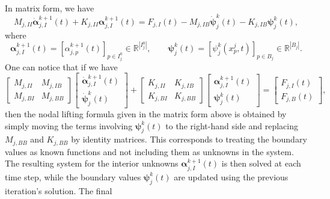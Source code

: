 \documentclass[a4paper, 11pt]{article}
\theoremstyle{remark}
\begin{document}
\begin{enumerate}[label = (\arabic*)]
\begin{align*}
\end{align*}
In matrix form, we have
\begin{equation*}
    M_{j, II}\boldsymbol{\dot{\alpha}}_{j, I}^{k+1}(t) + K_{j, II}\boldsymbol{\alpha}_{j, I}^{k+1}(t) = F_{j, I}(t) - M_{j, IB}\boldsymbol{\dot{\psi}}_{j}^{k}(t) - K_{j, IB}\boldsymbol{\psi}_{j}^{k}(t),
\end{equation*}
where
\begin{equation*}
    \boldsymbol{\alpha}_{j, I}^{k+1}(t) = [\alpha_{j, p}^{k+1}(t)]_{p\in I^{0}_{j}}\in\mathbb{R}^{|I^{0}_{j}|}, \qquad \boldsymbol{\psi}_{j}^{k}(t) = [\psi_{j}^{k}(x^{j}_{p}, t)]_{p\in B_{j}}\in\mathbb{R}^{|B_{j}|}.
\end{equation*}
One can notice that if we have
\begin{equation*}
    \begin{bmatrix}
        M_{j, II} & M_{j, IB}\\
        M_{j, BI} & M_{j, BB}
    \end{bmatrix}
    \begin{bmatrix}
        \boldsymbol{\dot{\alpha}}_{j, I}^{k+1}(t)\\
        \boldsymbol{\dot{\psi}}_{j}^{k}(t)
    \end{bmatrix}
    + 
    \begin{bmatrix}
        K_{j, II} & K_{j, IB}\\
        K_{j, BI} & K_{j, BB}
    \end{bmatrix}
    \begin{bmatrix}
        \boldsymbol{\alpha}_{j, I}^{k+1}(t)\\
        \boldsymbol{\psi}_{j}^{k}(t)
    \end{bmatrix}
    =
    \begin{bmatrix}
        F_{j, I}(t)\\
        F_{j, B}(t)
    \end{bmatrix},
\end{equation*}
then the nodal lifting formula given in the matrix form above is obtained by simply moving the terms involving
$\boldsymbol{\psi}_{j}^{k}(t)$ to the right-hand side and replacing $M_{j, BB}$ and $K_{j, BB}$ by identity matrices. 
This corresponds to treating the boundary values as known functions and not including them as unknowns in the system. 
The resulting system for the interior unknowns $\boldsymbol{\alpha}_{j, I}^{k+1}(t)$ is then solved at each time step, 
while the boundary values $\boldsymbol{\psi}_{j}^{k}(t)$ are updated using the previous iteration's solution. The final

\end{enumerate}
\end{document}

